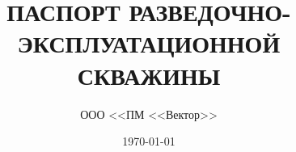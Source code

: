 


\author{ООО <<ПМ <<Вектор>>}\label{company}
\title{ПАСПОРТ РАЗВЕДОЧНО-ЭКСПЛУАТАЦИОННОЙ СКВАЖИНЫ}
\date{\today}

\newcommand{\txtExecutor}{ООО <<ПМ <<Вектор>>}	%
\newcommand{\txtYear}{2025}						%
\newcommand{\txtNumber}{№ 1р-э}  				%
\newcommand{\txtPump}{<<Belamos>>}  				%
\newcommand{\txtOgolovok}{+0,4}					%
\newcommand{\txtBoringMode}{ударным } 			%
%
\newcommand{\txtAddress}{{ ADDRESS }} 		%
\newcommand{\txtHeight}{}					%
\newcommand{\txtCadaster}{{ CADASTER }} 	%
\newcommand{\txtCoords}{{ COORDINATES }}	%
\newcommand{\txtPhoneNumber}{{ PHONE }}		%
\newcommand{\txtDepth}{0.0}					%
\newcommand{\txtDebit}{0.0}					%
\newcommand{\txtLevel}{0.0}					%
\newcommand{\txtHorizDepth}{0.0}			%
\newcommand{\txtGeology}{трещиноватым разностям палеозоя}  %
\newcommand{\txtCondMaterial}{полиэтиленовая}	%
\newcommand{\txtCondDiam}{160}					%
\newcommand{\txtCondBtm}{0.0}					%
\newcommand{\txtTubeMaterial}{полиэтиленовая}	%
\newcommand{\txtTubeDiam}{128}					%
\newcommand{\txtTubeBtm}{0.0}					%
\newcommand{\txtHoleDiam}{132}					%
\newcommand{\txtPumpDepth}{0.0}					%

\newcommand{\txtGeological}{
	1. & Q IV а & Почвенно-растительный слой, кора выветривания & 0    & 0,5       & III \\  \hline
	2. & Mz     & Кора выветривания - суглинки                  & 0,5  & 10,0      & V   \\  \hline
	3. & Pz     & Скальные грунты  трещиноватые                 & 10,0 & \num{\txtDepth} & VIII \\ \hline
}

